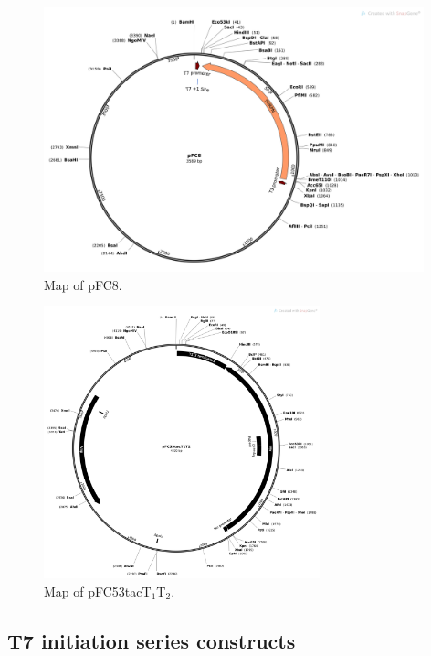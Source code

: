 \documentclass[11pt]{article}
\begin{document}
\begin{figure}[H]
	\includegraphics[width=11cm]{images/plasmid_maps/pFC8_Map.png}
	\centering
	\caption{Map of pFC8.}
	\label{fig:map_pFC8}
\end{figure}


\begin{figure}[H]
	\includegraphics[width=8cm]{images/plasmid_maps/pFC53tacT1T2_Map.png}
	\centering
	\caption{Map of pFC53tacT$_1$T$_2$.}
	\label{fig:map_pFC53tacT1T2}
\end{figure}




\subsection{T7 initiation series constructs}
\label{T7:init} 
\end{document}

